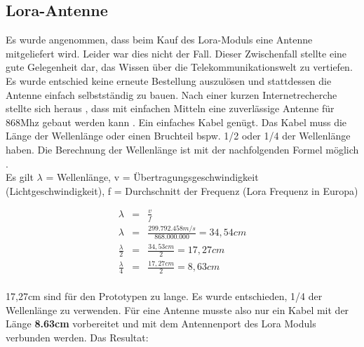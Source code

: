 \documentclass[11pt,english,german]{report}
\theoremstyle{definition}
\begin{document}
\subsection{Lora-Antenne}
Es wurde angenommen, dass beim Kauf des Lora-Moduls eine Antenne mitgeliefert wird. Leider war dies nicht der Fall. Dieser Zwischenfall stellte eine gute Gelegenheit dar, das Wissen über die Telekommunikationswelt zu vertiefen. Es wurde entschied keine erneute Bestellung auszulösen und stattdessen  die Antenne einfach selbstständig zu bauen. Nach einer kurzen Internetrecherche stellte sich heraus , dass mit einfachen Mitteln eine zuverlässige Antenne für 868Mhz gebaut werden kann \cite{wavelengthTTN}. Ein einfaches Kabel genügt. Das Kabel muss die Länge der Wellenlänge oder einen Bruchteil bspw. 1/2 oder 1/4 der Wellenlänge haben. Die Berechnung der Wellenlänge ist mit der nachfolgenden Formel möglich \cite{wavelength}.\\[0.3cm]
Es gilt $\lambda$ = Wellenlänge, v = Übertragungsgeschwindigkeit (Lichtgeschwindigkeit), f = Durchschnitt der Frequenz (Lora Frequenz in Europa)
\begin{center}
	\begin{eqnarray*}
		\lambda &=& \frac{v}{f}\\
		\lambda &=& \frac{299.792.458 m/s}{868.000.000} = 34,54cm\\
		\frac{\lambda}{2} &=& \frac{34,53cm}{2} = 17,27cm\\
		\frac{\lambda}{4} &=& \frac{17,27cm}{2} = 8,63cm \\
	\end{eqnarray*}
\end{center}
17,27cm sind für den Prototypen zu lange. Es wurde entschieden, 1/4 der Wellenlänge zu verwenden. Für eine Antenne musste also nur ein Kabel mit der Länge \textbf{8.63cm} vorbereitet und mit dem Antennenport des Lora Moduls verbunden werden.
\newpage
Das Resultat:
\end{document}
